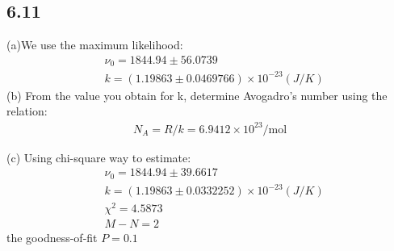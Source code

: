 \documentclass{article}
\begin{document}
\begin{CJK*}{GBK}{song}
 
 \section{6.11}
 (a)We use the maximum likelihood:
 \begin{equation}
 \begin{aligned}
& \nu_0=1844.94\pm56.0739\\
&k=(1.19863\pm0.0469766)\times 10^{-23}(J/K)
 \end{aligned}
 \end{equation}
 (b)
 From the value you obtain for k, determine Avogadro's number using the relation:
 \begin{equation}
  \begin{aligned}
 N_A=R/k=6.9412 \times10^{23}/\text{mol}
 \end{aligned}
 \end{equation}
 
(c)
Using chi-square way to estimate:
 \begin{equation}
 \begin{aligned}
& \nu_0=1844.94\pm39.6617\\
&k=(1.19863\pm0.0332252)\times 10^{-23}(J/K)\\
&\chi^2=4.5873\\
&M-N=2
 \end{aligned}
 \end{equation}
the goodness-of-fit $P=0.1$
 
 
 
 
 
 
 
 
 
 
 
 
\end{CJK*}
\end{document}
